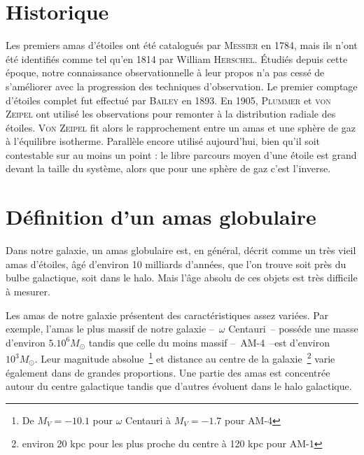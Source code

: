 \section{Historique}
Les premiers amas d'étoiles ont été catalogués par \textsc{Messier} en 1784, mais ils n'ont été identifiés comme tel qu'en 1814 par William \textsc{Herschel}. Étudiés depuis cette époque, notre connaissance
	observationnelle à leur propos n'a pas cessé de s'améliorer avec la progression des techniques d'observation.
	Le premier comptage d'étoiles complet fut effectué par \textsc{Bailey} en 1893. En 1905, \textsc{Plummer} et \textsc{von Zeipel}	ont utilisé les observations pour
	remonter à la distribution radiale des étoiles. \textsc{Von Zeipel} fit alors le rapprochement entre un amas et une sphère de gaz à l'équilibre isotherme.
	Parallèle encore utilisé aujourd'hui, bien qu'il soit contestable sur au moins un point : le libre parcours moyen d'une étoile est grand devant la taille du
	système, alors que pour une sphère de gaz c'est l'inverse.%

\section{Définition d'un amas globulaire}
	Dans notre galaxie, un amas globulaire est, en général, décrit comme un très vieil amas d'étoiles, âgé d'environ 10 milliards d'années, que l'on trouve soit près du bulbe galactique,
	soit dans le halo. Mais l'âge absolu de ces objets est très difficile à mesurer.

	Les amas de notre galaxie présentent des caractéristiques assez variées. Par exemple, l'amas le plus massif de notre galaxie --~$\omega$ Centauri~-- posséde une masse d'environ $5.10^6 M_\odot$
	tandis que celle du moins massif --~AM-4~--est d'environ $10^3 M_\odot$.
	Leur magnitude absolue~\footnote{De $M_V = -10.1$ pour $\omega$ Centauri à $M_V = -1.7$ pour AM-4} et distance au centre de la galaxie~\footnote{environ 20 kpc pour les plus proche du centre à 120 kpc pour AM-1} varie également dans de grandes proportions.
	Une partie des amas est concentrée autour du centre galactique tandis que d'autres évoluent dans le halo galactique.

